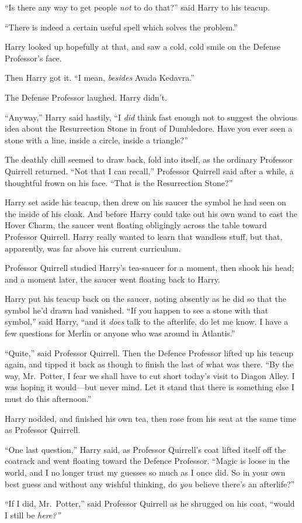 ``Is there any way to get people \emph{not} to do that?'' said Harry to
his teacup.

``There is indeed a certain useful spell which solves the problem.''

Harry looked up hopefully at that, and saw a cold, cold smile on the
Defense Professor's face.

Then Harry got it. ``I mean, \emph{besides} Avada Kedavra.''

The Defense Professor laughed. Harry didn't.

``Anyway,'' Harry said hastily, ``I \emph{did} think fast enough not to
suggest the obvious idea about the Resurrection Stone in front of
Dumbledore. Have you ever seen a stone with a line, inside a circle,
inside a triangle?''

The deathly chill seemed to draw back, fold into itself, as the ordinary
Professor Quirrell returned. ``Not that I can recall,'' Professor
Quirrell said after a while, a thoughtful frown on his face. ``That is
the Resurrection Stone?''

Harry set aside his teacup, then drew on his saucer the symbol he had
seen on the inside of his cloak. And before Harry could take out his own
wand to cast the Hover Charm, the saucer went floating obligingly across
the table toward Professor Quirrell. Harry really wanted to learn that
wandless stuff, but that, apparently, was far above his current
curriculum.

Professor Quirrell studied Harry's tea-saucer for a moment, then shook
his head; and a moment later, the saucer went floating back to Harry.

Harry put his teacup back on the saucer, noting absently as he did so
that the symbol he'd drawn had vanished. ``If you happen to see a stone
with that symbol,'' said Harry, ``and it \emph{does} talk to the
afterlife, do let me know. I have a few questions for Merlin or anyone
who was around in Atlantis.''

``Quite,'' said Professor Quirrell. Then the Defence Professor lifted up
his teacup again, and tipped it back as though to finish the last of
what was there. ``By the way, Mr.~Potter, I fear we shall have to cut
short today's visit to Diagon Alley. I was hoping it would---but never
mind. Let it stand that there is something else I must do this
afternoon.''

Harry nodded, and finished his own tea, then rose from his seat at the
same time as Professor Quirrell.

``One last question,'' Harry said, as Professor Quirrell's coat lifted
itself off the coatrack and went floating toward the Defence Professor.
``Magic is loose in the world, and I no longer trust my guesses so much
as I once did. So in your own best guess and without any wishful
thinking, do \emph{you} believe there's an afterlife?''

``If I did, Mr.~Potter,'' said Professor Quirrell as he shrugged on his
coat, ``would I still be \emph{here?''}
